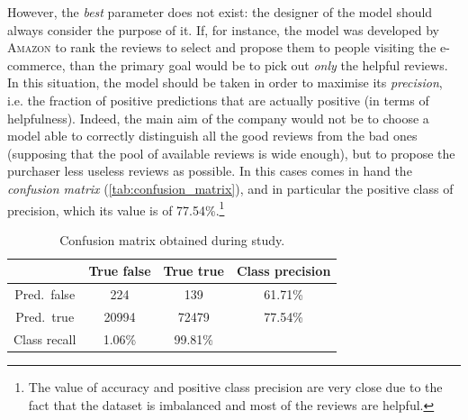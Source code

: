\documentclass[a4paper]{article}
\begin{document}
			However, the \emph{best} parameter does not exist: the designer of the model should always consider the purpose of it. If, for instance, the model was developed by \textsc{Amazon} to rank the reviews to select and propose them to people visiting the e-commerce, than the primary goal would be to pick out \emph{only} the helpful reviews. In this situation, the model should be taken in order to maximise its \emph{precision}, i.e. the fraction of positive predictions that are actually positive (in terms of helpfulness). Indeed, the main aim of the company would not be to choose a model able to correctly distinguish all the good reviews from the bad ones (supposing that the pool of available reviews is wide enough), but to propose the purchaser less useless reviews as possible. In this cases comes in hand the \emph{confusion matrix} (\autoref{tab:confusion_matrix}), and in particular the positive class of precision, which its value is of 77.54\%.\footnote{The value of accuracy and positive class precision are very close due to the fact that the dataset is imbalanced and most of the reviews are helpful.}
			
		\begin{table}[]
			\centering
			\caption{Confusion matrix obtained during study.}
			\label{tab:confusion_matrix}
			\begin{tabular}{@{}cl|cc|c@{}}
				\toprule
				\multicolumn{2}{c|}{}             & True false & True true & Class precision \\ \midrule
				\multicolumn{2}{c|}{\multirow{2}{*}{Pred.~false}} & \multirow{2}{*}{224}   & \multirow{2}{*}{139}   & \multirow{2}{*}{61.71\%} \\
				\multicolumn{2}{c|}{}             &            &           &                 \\
				\multicolumn{2}{c|}{\multirow{2}{*}{Pred.~true}}  & \multirow{2}{*}{20994} & \multirow{2}{*}{72479} & \multirow{2}{*}{77.54\%} \\
				\multicolumn{2}{c|}{}             &            &           &                 \\ \midrule
				\multicolumn{2}{c|}{Class recall} & 1.06\%     & 99.81\%   &                 \\ \bottomrule
			\end{tabular}%
		\end{table}
			
\end{document}
